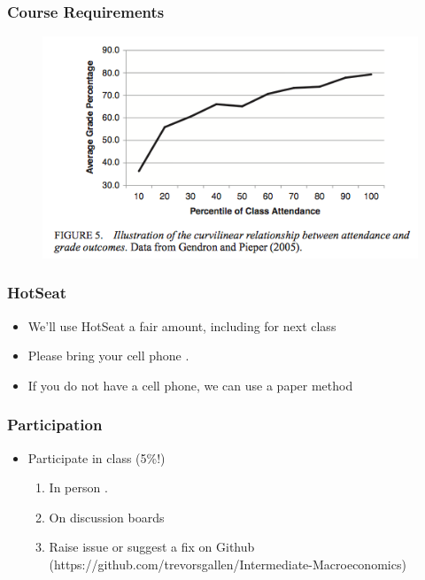\documentclass{beamer}
\begin{document}
\begin{frame}
\frametitle[alignment=center]{Course Requirements}
\begin{figure}
\includegraphics[scale=0.62]{Attendance.png}
\end{figure}
\end{frame}


\begin{frame}
\frametitle[alignment=center]{HotSeat}
\begin{itemize}
\item We'll use HotSeat a fair amount, including for next class
\bigskip
\item Please bring your cell phone .
\bigskip
\item If you do not have a cell phone, we can use a paper method
\end{itemize}
\end{frame}

\begin{frame}
\frametitle[alignment=center]{Participation}
\begin{itemize}
\item Participate in class (5\%!)
\bigskip
\begin{enumerate}
\item In person .
\bigskip
\item On discussion boards
\bigskip
\item Raise issue or suggest a fix on Github (https://github.com/trevorsgallen/Intermediate-Macroeconomics)
\end{enumerate}
\end{itemize}
\end{frame}
\end{document}
